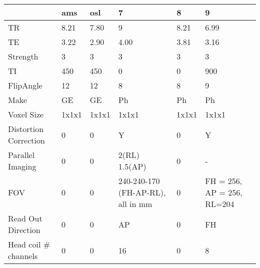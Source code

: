 \begin{table}
[]
\centering
\begin{tabular}{llllll}
\toprule
{} & ams & osl &              7 & 8 &        9 \\
\midrule
TR                    &                   8.21 &               7.80 &                                  9 &               8.21 &                        6.99 \\
TE                    &                   3.22 &               2.90 &                               4.00 &               3.81 &                        3.16 \\
Strength              &                      3 &                  3 &                                  3 &                  3 &                           3 \\
TI                    &                    450 &                450 &                                  0 &                  0 &                         900 \\
FlipAngle             &                     12 &                 12 &                                  8 &                  8 &                           9 \\
Make                  &                     GE &                 GE &                                 Ph &                 Ph &                          Ph \\
Voxel Size            &                  1x1x1 &              1x1x1 &                              1x1x1 &              1x1x1 &                       1x1x1 \\
Distortion Correction &                      0 &                  0 &                                  Y &                  0 &                           Y \\
Parallel Imaging      &                      0 &                  0 &                      2(RL) 1.5(AP) &                  0 &                           - \\
FOV                   &                      0 &                  0 &  240-240-170 (FH-AP-RL), all in mm &                  0 &  FH = 256, AP = 256, RL=204 \\
Read Out Direction    &                      0 &                  0 &                                 AP &                  0 &                          FH \\
Head coil \# channels  &                      0 &                  0 &                                 16 &                  0 &                           8 \\

\end{tabular}
\end{table}
